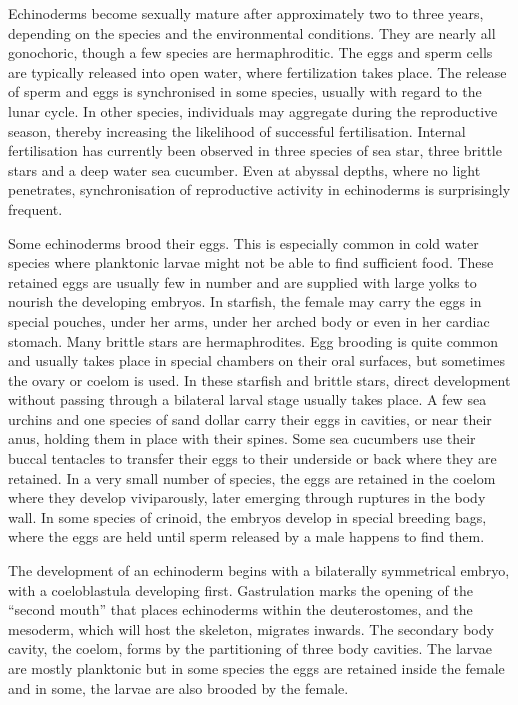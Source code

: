 Echinoderms become sexually mature after approximately two to three years, depending on the species and the environmental conditions. They are nearly all gonochoric, though a few species are hermaphroditic. The eggs and sperm cells are typically released into open water, where fertilization takes place. The release of sperm and eggs is synchronised in some species, usually with regard to the lunar cycle. In other species, individuals may aggregate during the reproductive season, thereby increasing the likelihood of successful fertilisation. Internal fertilisation has currently been observed in three species of sea star, three brittle stars and a deep water sea cucumber. Even at abyssal depths, where no light penetrates, synchronisation of reproductive activity in echinoderms is surprisingly frequent.

Some echinoderms brood their eggs. This is especially common in cold water species where planktonic larvae might not be able to find sufficient food. These retained eggs are usually few in number and are supplied with large yolks to nourish the developing embryos. In starfish, the female may carry the eggs in special pouches, under her arms, under her arched body or even in her cardiac stomach. Many brittle stars are hermaphrodites. Egg brooding is quite common and usually takes place in special chambers on their oral surfaces, but sometimes the ovary or coelom is used. In these starfish and brittle stars, direct development without passing through a bilateral larval stage usually takes place. A few sea urchins and one species of sand dollar carry their eggs in cavities, or near their anus, holding them in place with their spines. Some sea cucumbers use their buccal tentacles to transfer their eggs to their underside or back where they are retained. In a very small number of species, the eggs are retained in the coelom where they develop viviparously, later emerging through ruptures in the body wall. In some species of crinoid, the embryos develop in special breeding bags, where the eggs are held until sperm released by a male happens to find them.

The development of an echinoderm begins with a bilaterally symmetrical embryo, with a coeloblastula developing first. Gastrulation marks the opening of the ``second mouth'' that places echinoderms within the deuterostomes, and the mesoderm, which will host the skeleton, migrates inwards. The secondary body cavity, the coelom, forms by the partitioning of three body cavities. The larvae are mostly planktonic but in some species the eggs are retained inside the female and in some, the larvae are also brooded by the female.

